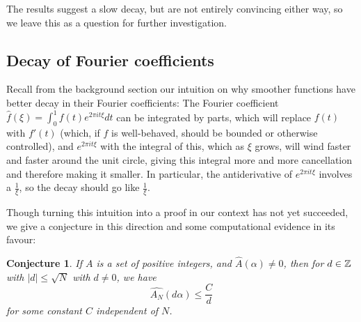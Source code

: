 \documentclass{report}
\newtheorem{conjecture}[theorem]{Conjecture}
\theoremstyle{remark}
\numberwithin{equation}{section}
\begin{document}
The results suggest a slow decay, but are not entirely convincing
either way, so we leave this as a question for further investigation.

\subsection{Decay of Fourier coefficients}

Recall from the background section our intuition on why smoother
functions have better decay in their Fourier coefficients: The Fourier
coefficient $\widehat{f}(\xi) = \int_0^1 f(t) e^{2\pi i t \xi} dt$ can
be integrated by parts, which will replace $f(t)$ with $f'(t)$ (which,
if $f$ is well-behaved, should be bounded or otherwise controlled),
and $e^{2\pi i t \xi}$ with the integral of this, which as $\xi$
grows, will wind faster and faster around the unit circle, giving this
integral more and more cancellation and therefore making it smaller.
In particular, the antiderivative of $e^{2\pi i t \xi}$ involves a
$\frac{1}{\xi}$, so the decay should go like $\frac{1}{\xi}$.

Though turning this intuition into a proof in our context has not yet
succeeded, we give a conjecture in this direction and some
computational evidence in its favour: 

\begin{conjecture}\label{conj:decay} 
  If $A$ is a \relevant set of positive integers, and
  $\widehat{A}(\alpha) \neq 0$, then for $d \in \mathbb{Z}$ with $|d| \leq \sqrt{N}$ with $d \neq 0$,
  we have
  \[\widehat{A_N}(d\alpha) \leq \frac{C}{d}\]
  for some constant $C$ independent of $N$.  
\end{conjecture}




\end{document}
